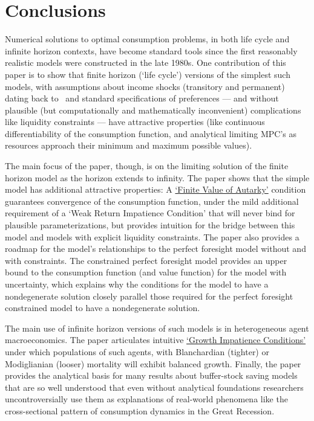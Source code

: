 \documentclass[BufferStockTheory]{subfiles}
\begin{document}
\hypertarget{Conclusions}{}
\section{Conclusions}

Numerical solutions to optimal consumption problems, in both life cycle and infinite horizon contexts, have become standard tools since the first reasonably realistic models were constructed in the late 1980s. One contribution of this paper is to show that finite horizon (`life cycle') versions of the simplest such models, with assumptions about income shocks (transitory and permanent) dating back to~\cite{friedmanATheory} and standard specifications of preferences --- and without plausible (but computationally and mathematically inconvenient) complications like liquidity constraints --- have attractive properties (like continuous differentiability of the consumption function, and analytical limiting MPC's as resources approach their minimum and maximum possible values).%

The main focus of the paper, though, is on the limiting solution of the finite horizon model as the horizon extends to infinity.  The paper shows that the simple model has additional attractive properties: A \href{https://econ-ark.github.io/BufferStockTheory#FVAC}{`Finite Value of Autarky'} condition guarantees convergence of the consumption function, under the mild additional requirement of a `Weak Return Impatience Condition' that will never bind for plausible parameterizations, but provides intuition for the bridge between this model and models with explicit liquidity constraints. The paper also provides a roadmap for the model's relationships to the perfect foresight model without and with constraints.  The constrained perfect foresight model provides an upper bound to the consumption function (and value function) for the model with uncertainty, which explains why the conditions for the model to have a nondegenerate solution closely parallel those required for the perfect foresight constrained model to have a nondegenerate solution.

The main use of infinite horizon versions of such models is in heterogeneous agent macroeconomics. The paper articulates intuitive \href{https://econ-ark.github.io/BufferStockTheory#GICAgg}{`Growth Impatience Conditions'} under which populations of such agents, with Blanchardian (tighter) or Modiglianian (looser) mortality will exhibit balanced growth.  Finally, the paper provides the analytical basis for many results about buffer-stock saving models that are so well understood that even without analytical foundations researchers uncontroversially use them as explanations of real-world phenomena like the cross-sectional pattern of consumption dynamics in the Great Recession.
\end{document}
